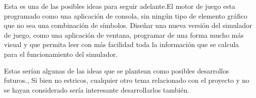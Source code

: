 Esta es una de las posibles ideas para seguir adelante.El motor de juego esta programado como una aplicación de consola, sin ningún tipo de elemento gráfico que no sea una combinación de símbolos. Diseñar una nueva versión del simulador de juego, como una aplicación de ventana, programar de una forma mucho más visual y que permita leer con más facilidad toda la información que se calcula para el funcionamiento del simulador.


Estas serían algunas de las ideas que se plantean como posibles desarrollos futuros., Si bien no estricos, cualquier otro tema relacionado con el proyecto y no se hayan considerado sería interesante desarrollarlos también.